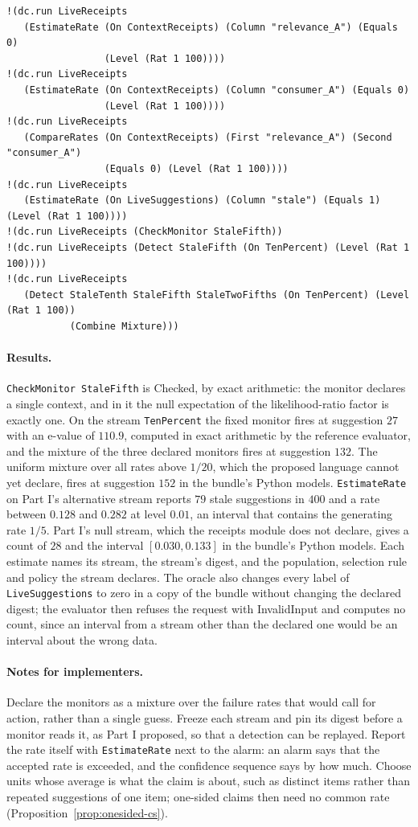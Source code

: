 \documentclass[11pt]{article}
\newcommand{\code}[1]{\texttt{#1}}
\theoremstyle{definition}
\theoremstyle{plain}
\begin{document}
\begin{lstlisting}[style=mettamod]
!(dc.run LiveReceipts
   (EstimateRate (On ContextReceipts) (Column "relevance_A") (Equals 0)
                 (Level (Rat 1 100))))
!(dc.run LiveReceipts
   (EstimateRate (On ContextReceipts) (Column "consumer_A") (Equals 0)
                 (Level (Rat 1 100))))
!(dc.run LiveReceipts
   (CompareRates (On ContextReceipts) (First "relevance_A") (Second "consumer_A")
                 (Equals 0) (Level (Rat 1 100))))
!(dc.run LiveReceipts
   (EstimateRate (On LiveSuggestions) (Column "stale") (Equals 1) (Level (Rat 1 100))))
!(dc.run LiveReceipts (CheckMonitor StaleFifth))
!(dc.run LiveReceipts (Detect StaleFifth (On TenPercent) (Level (Rat 1 100))))
!(dc.run LiveReceipts
   (Detect StaleTenth StaleFifth StaleTwoFifths (On TenPercent) (Level (Rat 1 100))
           (Combine Mixture)))
\end{lstlisting}

\paragraph{Results.} \code{CheckMonitor StaleFifth} is Checked, by exact arithmetic: the monitor
declares a single context, and in it the null expectation of the likelihood-ratio factor is exactly
one. On the stream \code{TenPercent} the fixed
monitor fires at suggestion $27$ with an e-value of $110.9$, computed in exact arithmetic by the
reference evaluator, and the mixture of the three declared monitors fires at suggestion $132$. The
uniform mixture over all rates above $1/20$, which the proposed language cannot yet declare, fires
at suggestion $152$ in the bundle's Python models. \code{EstimateRate} on Part I's alternative
stream reports $79$ stale suggestions in $400$ and a rate between $0.128$ and $0.282$ at level
$0.01$, an interval that contains the generating rate $1/5$. Part I's null stream, which the
receipts module does not declare, gives a count of $28$ and the interval $[0.030,0.133]$ in the
bundle's Python models. Each estimate names its stream, the stream's digest, and the population,
selection rule and policy the stream declares. The oracle also changes every label of
\code{LiveSuggestions} to zero in a copy of the bundle without changing the declared digest; the
evaluator then refuses the request with InvalidInput and computes no count, since an interval from a
stream other than the declared one would be an interval about the wrong data.

\paragraph{Notes for implementers.} Declare the monitors as a mixture over the failure rates that
would call for action, rather than a single guess. Freeze each stream and pin its digest before a
monitor reads it, as Part I proposed, so that a detection can be replayed. Report the rate itself
with \code{EstimateRate} next to the alarm: an alarm says that the accepted rate is exceeded, and
the confidence sequence says by how much. Choose units whose average is what the claim is about,
such as distinct items rather than repeated suggestions of one item; one-sided claims then need no
common rate (Proposition~\ref{prop:onesided-cs}).
\end{document}
